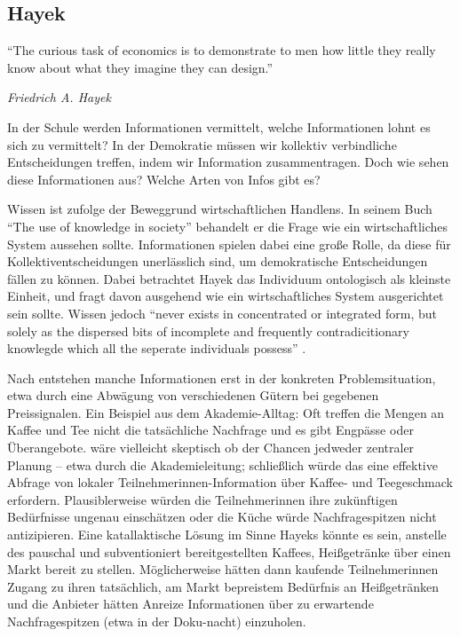 \subsection{Hayek}

\epigraph{
		``The curious task of economics is to demonstrate to men how little they really know about what they imagine they can design.''}
	{
		\emph{Friedrich A. Hayek
	}

In der Schule werden Informationen vermittelt, welche Informationen lohnt es sich zu vermittelt?
In der Demokratie müssen wir kollektiv verbindliche Entscheidungen treffen, indem wir Information zusammentragen.
Doch wie sehen diese Informationen aus? Welche Arten von Infos gibt es?

Wissen ist \citeauthor{hayek-1945} zufolge der Beweggrund wirtschaftlichen Handlens.
In seinem Buch ``The use of knowledge in society'' behandelt er die Frage wie ein wirtschaftliches System aussehen sollte.
Informationen spielen dabei eine große Rolle, da diese für Kollektiventscheidungen unerlässlich sind, um demokratische Entscheidungen fällen zu können.
Dabei betrachtet Hayek das Individuum ontologisch als kleinste Einheit, und fragt davon ausgehend wie ein wirtschaftliches System ausgerichtet sein sollte.
Wissen jedoch ``never exists in concentrated or integrated form, but solely as the dispersed bits of incomplete and frequently contradicitionary knowlegde which all the seperate individuals possess'' \citep[520]{hayek-1945}.

Nach \citeauthor{hayek-1945} entstehen manche Informationen erst in der konkreten Problemsituation, etwa durch eine Abwägung von verschiedenen Gütern bei gegebenen Preissignalen.
Ein Beispiel aus dem Akademie-Alltag: Oft treffen die Mengen an Kaffee und Tee nicht die tatsächliche Nachfrage und es gibt Engpässe oder Überangebote.
\citeauthor{hayek-1945} wäre vielleicht skeptisch ob der Chancen jedweder zentraler Planung – etwa durch die Akademieleitung; schließlich würde das eine effektive Abfrage von lokaler Teilnehmerinnen-Information über Kaffee- und Teegeschmack erfordern.
Plausiblerweise würden die Teilnehmerinnen ihre zukünftigen Bedürfnisse ungenau einschätzen oder die Küche würde Nachfragespitzen nicht antizipieren.
Eine katallaktische Lösung im Sinne Hayeks könnte es sein, anstelle des pauschal und subventioniert bereitgestellten Kaffees, Heißgetränke über einen Markt bereit zu stellen.
Möglicherweise hätten dann kaufende Teilnehmerinnen Zugang zu ihren tatsächlich, am Markt bepreistem Bedürfnis an Heißgetränken und die Anbieter hätten Anreize Informationen über zu erwartende Nachfragespitzen (etwa in der Doku-nacht) einzuholen.

}
